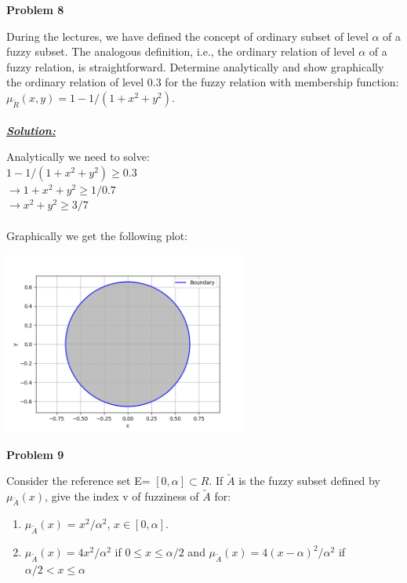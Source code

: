 \documentclass{article}
\begin{document}
\newpage
\noindent \textbf{Problem 8}

\noindent During the lectures, we have defined the concept of ordinary subset of level $\alpha$ of a fuzzy 
subset. The analogous definition, i.e., the ordinary relation of level $\alpha$ of a fuzzy relation, is 
straightforward. Determine analytically and show graphically the ordinary relation of level 
0.3 for the fuzzy relation with membership function: $\mu_{\utilde{R}}(x, y) = 1 - 1/(1+x^2+y^2)$.
\\ \\
\noindent \underline{\textbf{\textit{Solution:}}}

\noindent Analytically we need to solve: \\
$1-1/(1+x^2+y^2) \geq 0.3 $ \\ $\rightarrow 1+x^2+y^2 \geq 1/0.7 $ \\
$ \rightarrow x^2 + y^2 \geq 3/7$
\\ \\
\noindent Graphically we get the following plot:

\begin{center}
\includegraphics[width=0.6\textwidth]{Problem8.png}
\end{center}


\newpage
\noindent \textbf{Problem 9}

\noindent Consider the reference set E= $[0, \alpha] \subset R$. If $\utilde{A}$ is the fuzzy subset defined by 
$\mu_{\utilde{A}}(x)$, give the index v of fuzziness of $\utilde{A}$ for:

\begin{enumerate} [label=\Alph*]
  \item $\mu_{\utilde{A}}(x)$ = $x^2/\alpha^2$, $x \in [0, \alpha].$
  \item $\mu_{\utilde{A}}(x) = 4x^2/\alpha^2$ if $0 \leq x\leq \alpha/2$ and $\mu_{\utilde{A}}(x) = 4(x-\alpha)^2/\alpha^2$ if $\alpha/2  <x \leq \alpha$
\end{enumerate}
\end{document}
